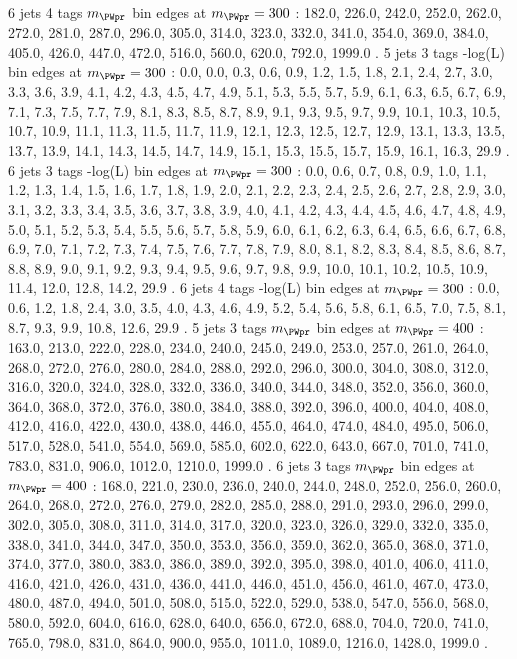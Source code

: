 6 jets 4 \Pqb tags $m_{\PWpr}$ bin edges at $m_{\PWpr}=300$ \GeV:
182.0, 226.0, 242.0, 252.0, 262.0, 272.0, 281.0, 287.0, 296.0, 305.0, 314.0, 323.0, 332.0, 341.0, 354.0, 369.0, 384.0, 405.0, 426.0, 447.0, 472.0, 516.0, 560.0, 620.0, 792.0, 1999.0 .
5 jets 3 \Pqb tags -log(L) bin edges at $m_{\PWpr}=300$ \GeV:
0.0, 0.0, 0.3, 0.6, 0.9, 1.2, 1.5, 1.8, 2.1, 2.4, 2.7, 3.0, 3.3, 3.6, 3.9, 4.1, 4.2, 4.3, 4.5, 4.7, 4.9, 5.1, 5.3, 5.5, 5.7, 5.9, 6.1, 6.3, 6.5, 6.7, 6.9, 7.1, 7.3, 7.5, 7.7, 7.9, 8.1, 8.3, 8.5, 8.7, 8.9, 9.1, 9.3, 9.5, 9.7, 9.9, 10.1, 10.3, 10.5, 10.7, 10.9, 11.1, 11.3, 11.5, 11.7, 11.9, 12.1, 12.3, 12.5, 12.7, 12.9, 13.1, 13.3, 13.5, 13.7, 13.9, 14.1, 14.3, 14.5, 14.7, 14.9, 15.1, 15.3, 15.5, 15.7, 15.9, 16.1, 16.3, 29.9 .
6 jets 3 \Pqb tags -log(L) bin edges at $m_{\PWpr}=300$ \GeV:
0.0, 0.6, 0.7, 0.8, 0.9, 1.0, 1.1, 1.2, 1.3, 1.4, 1.5, 1.6, 1.7, 1.8, 1.9, 2.0, 2.1, 2.2, 2.3, 2.4, 2.5, 2.6, 2.7, 2.8, 2.9, 3.0, 3.1, 3.2, 3.3, 3.4, 3.5, 3.6, 3.7, 3.8, 3.9, 4.0, 4.1, 4.2, 4.3, 4.4, 4.5, 4.6, 4.7, 4.8, 4.9, 5.0, 5.1, 5.2, 5.3, 5.4, 5.5, 5.6, 5.7, 5.8, 5.9, 6.0, 6.1, 6.2, 6.3, 6.4, 6.5, 6.6, 6.7, 6.8, 6.9, 7.0, 7.1, 7.2, 7.3, 7.4, 7.5, 7.6, 7.7, 7.8, 7.9, 8.0, 8.1, 8.2, 8.3, 8.4, 8.5, 8.6, 8.7, 8.8, 8.9, 9.0, 9.1, 9.2, 9.3, 9.4, 9.5, 9.6, 9.7, 9.8, 9.9, 10.0, 10.1, 10.2, 10.5, 10.9, 11.4, 12.0, 12.8, 14.2, 29.9 .
6 jets 4 \Pqb tags -log(L) bin edges at $m_{\PWpr}=300$ \GeV:
0.0, 0.6, 1.2, 1.8, 2.4, 3.0, 3.5, 4.0, 4.3, 4.6, 4.9, 5.2, 5.4, 5.6, 5.8, 6.1, 6.5, 7.0, 7.5, 8.1, 8.7, 9.3, 9.9, 10.8, 12.6, 29.9 .
5 jets 3 \Pqb tags $m_{\PWpr}$ bin edges at $m_{\PWpr}=400$ \GeV:
163.0, 213.0, 222.0, 228.0, 234.0, 240.0, 245.0, 249.0, 253.0, 257.0, 261.0, 264.0, 268.0, 272.0, 276.0, 280.0, 284.0, 288.0, 292.0, 296.0, 300.0, 304.0, 308.0, 312.0, 316.0, 320.0, 324.0, 328.0, 332.0, 336.0, 340.0, 344.0, 348.0, 352.0, 356.0, 360.0, 364.0, 368.0, 372.0, 376.0, 380.0, 384.0, 388.0, 392.0, 396.0, 400.0, 404.0, 408.0, 412.0, 416.0, 422.0, 430.0, 438.0, 446.0, 455.0, 464.0, 474.0, 484.0, 495.0, 506.0, 517.0, 528.0, 541.0, 554.0, 569.0, 585.0, 602.0, 622.0, 643.0, 667.0, 701.0, 741.0, 783.0, 831.0, 906.0, 1012.0, 1210.0, 1999.0 .
6 jets 3 \Pqb tags $m_{\PWpr}$ bin edges at $m_{\PWpr}=400$ \GeV:
168.0, 221.0, 230.0, 236.0, 240.0, 244.0, 248.0, 252.0, 256.0, 260.0, 264.0, 268.0, 272.0, 276.0, 279.0, 282.0, 285.0, 288.0, 291.0, 293.0, 296.0, 299.0, 302.0, 305.0, 308.0, 311.0, 314.0, 317.0, 320.0, 323.0, 326.0, 329.0, 332.0, 335.0, 338.0, 341.0, 344.0, 347.0, 350.0, 353.0, 356.0, 359.0, 362.0, 365.0, 368.0, 371.0, 374.0, 377.0, 380.0, 383.0, 386.0, 389.0, 392.0, 395.0, 398.0, 401.0, 406.0, 411.0, 416.0, 421.0, 426.0, 431.0, 436.0, 441.0, 446.0, 451.0, 456.0, 461.0, 467.0, 473.0, 480.0, 487.0, 494.0, 501.0, 508.0, 515.0, 522.0, 529.0, 538.0, 547.0, 556.0, 568.0, 580.0, 592.0, 604.0, 616.0, 628.0, 640.0, 656.0, 672.0, 688.0, 704.0, 720.0, 741.0, 765.0, 798.0, 831.0, 864.0, 900.0, 955.0, 1011.0, 1089.0, 1216.0, 1428.0, 1999.0 .

